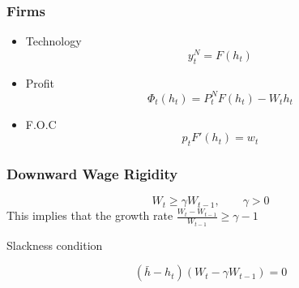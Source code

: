 \documentclass[mathserif]{beamer}
\begin{document}
    \begin{frame}
        \frametitle{Firms}
            \begin{itemize}
                \item Technology
                    \begin{equation}
                        \label{eq:production}
                        y^N_t = F(h_t)
                    \end{equation}
                \item Profit
                    \begin{equation}
                        \label{eq:profit}
                        \Phi_t(h_t) = P^N_t F(h_t) - W_t h_t
                    \end{equation}
                \item F.O.C
                    \begin{equation}
                        \label{eq:firm-FOC}
                        p_t F'(h_t) = w_t
                    \end{equation}
            \end{itemize}
    \end{frame}

    \begin{frame}
        \frametitle{Downward Wage Rigidity}

        \begin{equation}
            W_t \ge \gamma W_{t-1}, \qquad \gamma > 0
        \end{equation}
        This implies that the growth rate
        $\frac{W_{t} - W_{t-1}}{W_{t-1}} \ge \gamma - 1$

        \vfill
        Slackness condition

        \begin{equation}
            \label{eq:wage-rigid}
            (\bar{h} - h_t)(W_t - \gamma W_{t-1}) = 0
        \end{equation}
    \end{frame}
\end{document}
